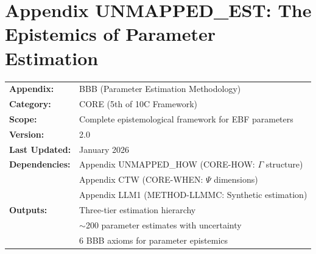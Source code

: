 \section{Appendix UNMAPPED_EST: The Epistemics of Parameter Estimation}
\label{app:bbb-estimation}


\begin{tcolorbox}[colback=blue!5!white, colframe=blue!75!black,
    title=\textbf{Appendix UNMAPPED_EST: CORE-WHERE}]

\begin{tabular}{@{}ll@{}}
\textbf{Appendix:} & BBB (Parameter Estimation Methodology) \\
\textbf{Category:} & CORE (5th of 10C Framework) \\
\textbf{Scope:} & Complete epistemological framework for EBF parameters \\
\textbf{Version:} & 2.0 \\
\textbf{Last Updated:} & January 2026 \\
\textbf{Dependencies:} & Appendix UNMAPPED_HOW (CORE-HOW: $\Gamma$ structure) \\
                       & Appendix CTW (CORE-WHEN: $\Psi$ dimensions) \\
                       & Appendix LLM1 (METHOD-LLMMC: Synthetic estimation) \\
\textbf{Outputs:} & Three-tier estimation hierarchy \\
                  & $\sim$200 parameter estimates with uncertainty \\
                  & 6 BBB axioms for parameter epistemics \\
\end{tabular}

\end{tcolorbox}


